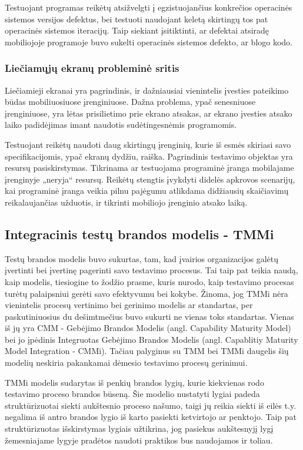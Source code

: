\documentclass{VUMIFPSkursinis}
\begin{document}
Testuojant programas reikėtų atsižvelgti į egzistuojančius konkrečios operacinės sistemos versijos defektus, bei testuoti naudojant keletą skirtingų tos pat operacinės sistemos iteracijų. Taip siekiant įsitiktinti, ar defektai atsiradę mobiliojoje programoje buvo sukelti operacinės sistemos defekto, ar blogo kodo.

\subsubsection{Liečiamųjų ekranų probleminė sritis}
Liečiamieji ekranai yra pagrindinis, ir dažniausiai vienintelis įvesties pateikimo būdas mobiliuosiuose įrenginiuose. Dažna problema, ypač senesniuose įrenginiuose, yra lėtas prisilietimo prie ekrano atsakas, ar ekrano įvesties atsako laiko padidėjimas imant naudotis sudėtingesnėmis programomis.

Testuojant reikėtų naudoti daug skirtingų įrenginių, kurie iš esmės skiriasi savo specifikacijomis, ypač ekranų dydžiu, raiška. Pagrindinis testavimo objektas yra resursų pasiskirstymas. Tikrinama ar testuojama programinė įranga mobilajame įrenginyje „neryja“ resursų. Reikėtų stengtis įvykdyti didelės apkrovos scenarijų, kai programinė įranga veikia pilnu pajėgumu atlikdama didžiausių skaičiavimų reikalaujančias užduotis, ir tikrinti mobiliojo įrenginio atsako laiką.

\subsection{Integracinis testų brandos modelis - TMMi}
Testų brandos modelis buvo sukurtas, tam, kad įvairios organizacijos galėtų įvertinti bei įvertinę pagerinti savo testavimo procesus. Tai taip pat teikia naudą, kaip modelis, tiesiogine to žodžio prasme, kuris nurodo, kaip testavimo procesas turėtų  palaipsniui gerėti savo efektyvumu bei kokybe. \cite{Burnstein:2010:PST:1965566} Žinoma, jog TMMi nėra vienintelis procesų vertinimo bei gerinimo modelis ar standartas, per paskutiniuosius du dešimtmečius buvo sukurti ne vienas toks standartas. Vienas iš jų yra CMM - Gebėjimo Brandos Modelis (angl. Capability Maturity Model) bei jo įpėdinis Integruotas Gebėjimo Brandos Modelis (angl. Capablitiy Maturity Model Integration - CMMi). Tačiau palyginus su TMM bei TMMi daugelis šių modelių neskiria pakankamai dėmesio testavimo procesų gerinimui. 

TMMi modelis sudarytas iš penkių brandos lygių, kurie kiekvienas rodo testavimo proceso brandos būseną. Šie modelio nustatyti lygiai padeda struktūrizuotai siekti aukštesnio proceso našumo, taigi jų reikia siekti iš eilės t.y. negalima iš antro brandos lygio iš karto pasiekti ketvirtojo ar penktojo. Taip pat struktūrizuotas išskirstymas lygiais užtikrina, jog pasiekus aukštesnyjį lygį žemesniajame lygyje pradėtos naudoti praktikos bus naudojamos ir toliau.
\end{document}

